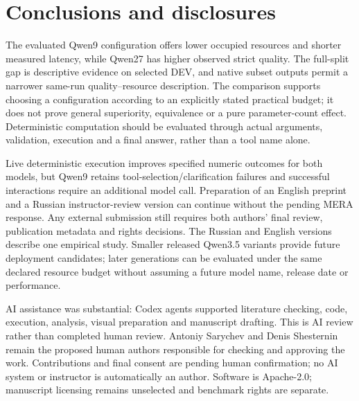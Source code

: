 \documentclass[10pt,a4paper]{article}
\begin{document}
\section{Conclusions and disclosures}

The evaluated Qwen9 configuration offers lower occupied resources and shorter measured latency, while Qwen27 has higher observed strict quality. The full-split gap is descriptive evidence on selected DEV, and native subset outputs permit a narrower same-run quality--resource description. The comparison supports choosing a configuration according to an explicitly stated practical budget; it does not prove general superiority, equivalence or a pure parameter-count effect. Deterministic computation should be evaluated through actual arguments, validation, execution and a final answer, rather than a tool name alone.


Live deterministic execution improves specified numeric outcomes for both models, but Qwen9 retains tool-selection/clarification failures and successful interactions require an additional model call. Preparation of an English preprint and a Russian instructor-review version can continue without the pending MERA response. Any external submission still requires both authors' final review, publication metadata and rights decisions. The Russian and English versions describe one empirical study. Smaller released Qwen3.5 variants provide future deployment candidates; later generations can be evaluated under the same declared resource budget without assuming a future model name, release date or performance.


AI assistance was substantial: Codex agents supported literature checking, code, execution, analysis, visual preparation and manuscript drafting. This is AI review rather than completed human review. Antoniy Sarychev and Denis Shesternin remain the proposed human authors responsible for checking and approving the work. Contributions and final consent are pending human confirmation; no AI system or instructor is automatically an author. Software is Apache-2.0; manuscript licensing remains unselected and benchmark rights are separate.
\end{document}
